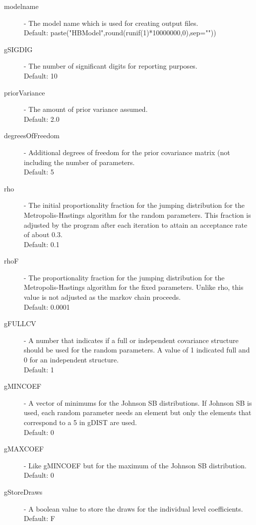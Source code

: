 \documentclass{article}
\begin{document}
\begin{description}
\item[modelname] - The model name which is used for creating output files. 
\\ Default: paste("HBModel",round(runif(1)*10000000,0),sep=""))

\item[gSIGDIG] - The number of significant digits for reporting purposes.\\ 
Default: 10

\item[priorVariance] - The amount of prior variance assumed.\\ 
Default: 2.0

\item[degreesOfFreedom] - Additional degrees of freedom for the prior covariance matrix (not including the number of parameters.\\ 
Default: 5

\item[rho] - The initial proportionality fraction for the jumping distribution for the Metropolis-Hastings algorithm for the random parameters. This fraction is adjusted by the program after each iteration to attain an acceptance rate of about 0.3.\\ 
Default: 0.1

\item[rhoF] - The proportionality fraction for the jumping distribution for the Metropolis-Hastings algorithm for the fixed parameters. Unlike rho, this value is not adjusted as the markov chain proceeds. \\
Default: 0.0001

\item[gFULLCV] - A number that indicates if a full or independent covariance structure should be used for the random parameters. A value of 1 indicated full and 0 for an independent structure.\\ Default: 1

\item[gMINCOEF] - A vector of minimums for the Johnson SB distributions. If Johnson SB is used, each random parameter needs an element but only the elements that correspond to a 5 in gDIST are used. \\ 
Default: 0

\item[gMAXCOEF] - Like gMINCOEF but for the maximum of the Johnson SB distribution. 
\\ Default: 0

\item[gStoreDraws] - A boolean value to store the draws for the individual level coefficients. \\ Default: F


\end{description}
\end{document}
